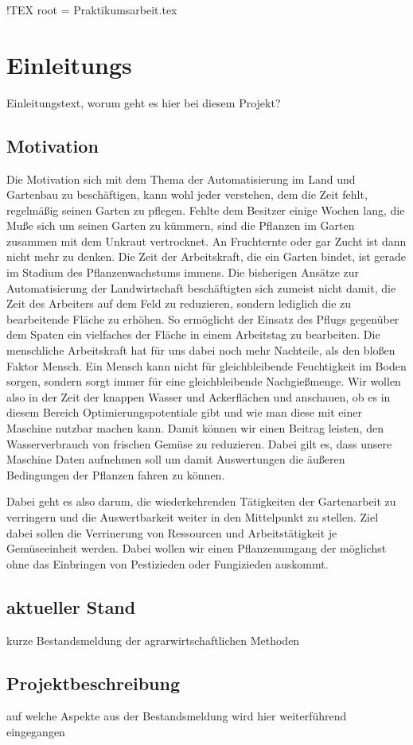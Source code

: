 !TEX root = Praktikumsarbeit.tex  %

\section{Einleitungs}
Einleitungstext, worum geht es hier bei diesem Projekt?

\subsection{Motivation} 


Die Motivation sich mit dem Thema der Automatisierung im Land und Gartenbau zu beschäftigen, kann wohl jeder verstehen, dem die Zeit fehlt, regelmäßig seinen Garten zu pflegen. Fehlte dem Besitzer einige Wochen lang, die Muße sich um seinen Garten zu kümmern, sind die Pflanzen im Garten zusammen mit dem Unkraut vertrocknet. An Fruchternte oder gar Zucht ist dann nicht mehr zu denken. Die Zeit der Arbeitskraft, die ein Garten bindet, ist gerade im Stadium des Pflanzenwachstums immens.
\newline
Die bisherigen Ansätze zur Automatisierung der Landwirtschaft beschäftigten sich zumeist nicht damit, die Zeit des Arbeiters auf dem Feld zu reduzieren, sondern lediglich die zu bearbeitende Fläche zu erhöhen. So ermöglicht der Einsatz des Pflugs gegenüber dem Spaten ein vielfaches der Fläche in einem Arbeitstag zu bearbeiten. 
\newline 
Die menschliche Arbeitskraft hat für uns dabei noch mehr Nachteile, als den bloßen Faktor Mensch. Ein Mensch kann nicht für gleichbleibende Feuchtigkeit im Boden sorgen, sondern sorgt immer für eine gleichbleibende Nachgießmenge. Wir wollen also in der Zeit der knappen Wasser und Ackerflächen und anschauen, ob es in diesem Bereich Optimierungspotentiale gibt und wie man diese mit einer Maschine nutzbar machen kann. Damit können wir einen Beitrag leisten, den Wasserverbrauch von frischen Gemüse zu reduzieren. Dabei gilt es, dass unsere Maschine Daten aufnehmen soll um damit Auswertungen die äußeren Bedingungen der Pflanzen fahren zu können. 

Dabei geht es also darum, die wiederkehrenden Tätigkeiten der Gartenarbeit zu verringern und die Auswertbarkeit weiter in den Mittelpunkt zu stellen. Ziel dabei sollen die Verrinerung von Ressourcen und Arbeitstätigkeit je Gemüseeinheit werden.
\newline
Dabei wollen wir einen Pflanzenumgang der möglichst ohne das Einbringen von Pestizieden oder Fungizieden auskommt.

\subsection{aktueller Stand}
kurze Bestandsmeldung der agrarwirtschaftlichen Methoden

\subsection{Projektbeschreibung}
auf welche Aspekte aus der Bestandsmeldung wird hier weiterführend eingegangen

